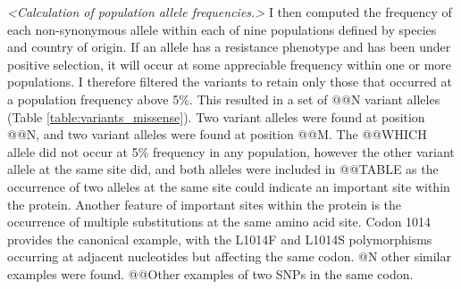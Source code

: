 \documentclass[a4paper,11pt,abstracton,hidelinks]{scrartcl}
\begin{document}
\textit{<Calculation of population allele frequencies.>}
%
I then computed the frequency of each non-synonymous allele within each of nine populations defined by species and country of origin.
%
If an allele has a resistance phenotype and has been under positive selection, it will occur at some appreciable frequency within one or more populations.
%
I therefore filtered the variants to retain only those that occurred at a population frequency above 5\%.
%
This resulted in a set of @@N variant alleles (Table \ref{table:variants_missense}).
%
Two variant alleles were found at position @@N, and two variant alleles were found at position @@M.
%
The @@WHICH allele did not occur at 5\% frequency in any population, however the other variant allele at the same site did, and both alleles were included in @@TABLE as the occurrence of two alleles at the same site could indicate an important site within the protein.
%
Another feature of important sites within the protein is the occurrence of multiple substitutions at the same amino acid site.
%
Codon 1014 provides the canonical example, with the L1014F and L1014S polymorphisms occurring at adjacent nucleotides but affecting the same codon.
%
@N other similar examples were found.
%
@@Other examples of two SNPs in the same codon.
\end{document}
